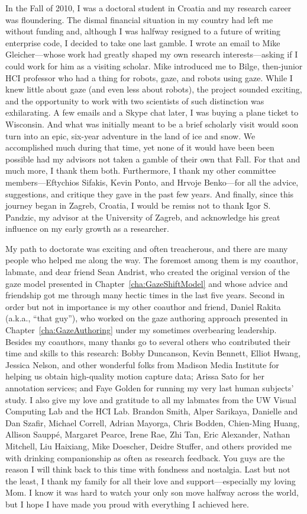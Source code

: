 In the Fall of 2010, I was a doctoral student in Croatia and my research career was floundering. The dismal financial situation in my country had left me without funding and, although I was halfway resigned to a future of writing enterprise code, I decided to take one last gamble. I wrote an email to Mike Gleicher---whose work had greatly shaped my own research interests---asking if I could work for him as a visiting scholar. Mike introduced me to Bilge, then-junior HCI professor who had a thing for robots, gaze, and robots using gaze. While I knew little about gaze (and even less about robots), the project sounded exciting, and the opportunity to work with two scientists of such distinction was exhilarating. A few emails and a Skype chat later, I was buying a plane ticket to Wisconsin. And what was initially meant to be a brief scholarly visit would soon turn into an epic, six-year adventure in the land of ice and snow. We accomplished much during that time, yet none of it would have been been possible had my advisors not taken a gamble of their own that Fall. For that and much more, I thank them both. Furthermore, I thank my other committee members---Eftychios Sifakis, Kevin Ponto, and Hrvoje Benko---for all the advice, suggestions, and critique they gave in the past few years. And finally, since this journey began in Zagreb, Croatia, I would be remiss not to thank Igor S. Pandzic, my advisor at the University of Zagreb, and acknowledge his great influence on my early growth as a researcher.

My path to doctorate was exciting and often treacherous, and there are many people who helped me along the way. The foremost among them is my coauthor, labmate, and dear friend Sean Andrist, who created the original version of the gaze model presented in Chapter~\ref{cha:GazeShiftModel} and whose advice and friendship got me through many hectic times in the last five years. Second in order but not in importance is my other coauthor and friend, Daniel Rakita (a.k.a., ``that guy''), who worked on the gaze authoring approach presented in Chapter~\ref{cha:GazeAuthoring} under my sometimes overbearing leadership. Besides my coauthors, many thanks go to several others who contributed their time and skills to this research: Bobby Duncanson, Kevin Bennett, Elliot Hwang, Jessica Nelson, and other wonderful folks from Madison Media Institute for helping us obtain high-quality motion capture data; Arissa Sato for her annotation services; and Faye Golden for running my very last human subjects' study. I also give my love and gratitude to all my labmates from the UW Visual Computing Lab and the HCI Lab. Brandon Smith, Alper Sarikaya, Danielle and Dan Szafir, Michael Correll, Adrian Mayorga, Chris Bodden, Chien-Ming Huang, Allison Saupp\'{e}, Margaret Pearce, Irene Rae, Zhi Tan, Eric Alexander, Nathan Mitchell, Liu Haixiang, Mike Doescher, Deidre Stuffer, and others provided me with drinking companionship as often as research feedback. You guys are the reason I will think back to this time with fondness and nostalgia. Last but not the least, I thank my family for all their love and support---especially my loving Mom. I know it was hard to watch your only son move halfway across the world, but I hope I have made you proud with everything I achieved here. 
